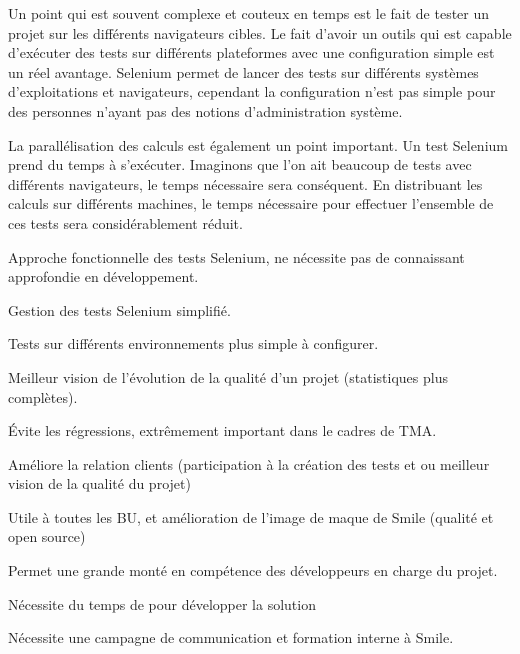 Un point qui est souvent complexe et couteux en temps est le fait de tester un projet 
sur les différents navigateurs cibles.  Le fait d'avoir un outils qui est capable d'exécuter
des tests sur différents plateformes avec une configuration simple est un réel avantage.
Selenium permet de lancer des tests sur différents systèmes d'exploitations et navigateurs, 
cependant la configuration n'est pas simple pour des personnes n'ayant pas des notions 
d'administration système. 

La parallélisation des calculs est également un point important.  Un test Selenium prend du 
temps à s'exécuter. Imaginons que l'on ait  beaucoup de tests avec différents navigateurs, le
temps nécessaire sera conséquent. En distribuant les calculs sur différents machines, le temps
nécessaire pour effectuer l'ensemble de ces tests sera considérablement réduit. 

\begin{description}
	\item \positif{}
	  Approche fonctionnelle des tests Selenium, ne nécessite pas de connaissant approfondie en développement.
	  
	\item \positif{}  Gestion des tests Selenium simplifié.
	\item \positif{}  Tests sur différents environnements plus simple à configurer.
	\item \positif{}  Meilleur vision de l'évolution de la qualité d'un projet (statistiques plus complètes).
	\item \positif{}  Évite les régressions, extrêmement important dans le cadres de TMA.
	\item \positif{}  Améliore la relation clients (participation à la création des tests et ou meilleur vision de la qualité du projet)
	\item \positif{}  Utile à toutes les BU, et amélioration de l'image de maque de Smile (qualité et open source)
	\item \positif{}  Permet une grande monté en compétence des développeurs en charge du projet. 
	\\
	\item \negatif{}   Nécessite du temps de pour développer  la solution
	\item \negatif{}   Nécessite une campagne de communication et formation interne à Smile.
\end{description}

